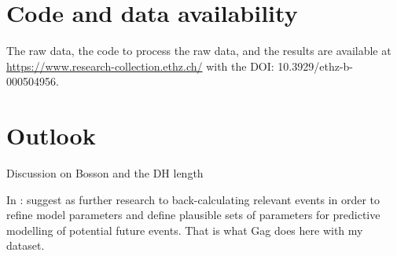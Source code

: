 \section{Code and data availability}

The raw data, the code to process the raw data, and the results are available at \url{https://www.research-collection.ethz.ch/} with the DOI: 10.3929/ethz-b-000504956.


\section{Outlook}

Discussion on Bosson and the DH length

In \citet{Emmer&al2022}: suggest as further research to back-calculating relevant events in order to refine model parameters and define plausible sets of parameters for predictive modelling of potential future events. That is what Gag does here with my dataset.

